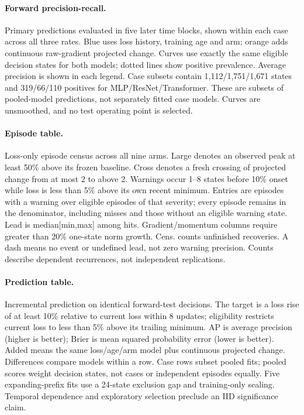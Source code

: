 \paragraph{Forward precision-recall.}
Primary predictions evaluated in five later time blocks, shown within each
case across all three rates. Blue uses loss history, training age and arm;
orange adds continuous raw-gradient projected change. Curves use exactly the
same eligible decision states for both models; dotted lines show positive
prevalence. Average precision is shown in each legend. Case subsets contain
1,112/1,751/1,671 states and 319/66/110 positives for MLP/ResNet/Transformer.
These are subsets of pooled-model predictions, not separately fitted case
models. Curves are unsmoothed, and no test operating point is selected.

\paragraph{Episode table.}
Loss-only episode census across all nine arms. Large denotes an observed
peak at least 50\% above its frozen baseline. Cross denotes a fresh crossing
of projected change from at most 2 to above 2. Warnings occur 1--8 states before
10\% onset while loss is less than 5\% above its own recent minimum. Entries
are episodes with a warning over eligible episodes of that severity; every
episode remains in the denominator, including misses and those without an
eligible warning state. Lead is median[min,max] among hits. Gradient/momentum
columns require greater than 20\% one-state norm growth. Cens. counts unfinished
recoveries. A dash means no event or undefined lead, not zero warning precision.
Counts describe dependent recurrences, not independent replications.

\paragraph{Prediction table.}
Incremental prediction on identical forward-test decisions. The target is a
loss rise of at least 10\% relative to current loss within 8 updates; eligibility
restricts current loss to less than 5\% above its trailing minimum. AP is average
precision (higher is better); Brier is mean squared probability error (lower is
better). Added means the same loss/age/arm model plus continuous projected
change. Differences compare models within a row. Case rows subset pooled fits;
pooled scores weight decision states, not cases or independent episodes equally.
Five expanding-prefix fits use a 24-state exclusion gap and training-only scaling.
Temporal dependence and exploratory selection preclude an IID significance claim.
